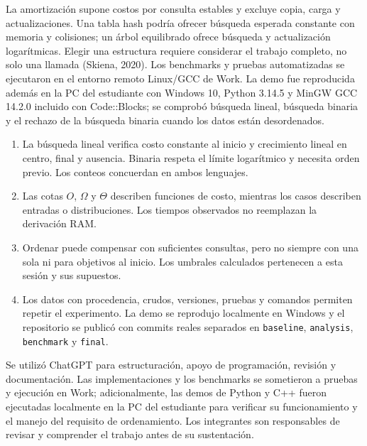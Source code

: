\documentclass[10pt,a4paper]{article}
\newcommand{\titulo}[1]{\vspace{3pt}{\large\bfseries\color{azul}#1}\par}
\begin{document}
La amortización supone costos por consulta estables y excluye copia, carga y actualizaciones. Una tabla hash podría ofrecer búsqueda esperada constante con memoria y colisiones; un árbol equilibrado ofrece búsqueda y actualización logarítmicas. Elegir una estructura requiere considerar el trabajo completo, no solo una llamada (Skiena, 2020). Los benchmarks y pruebas automatizadas se ejecutaron en el entorno remoto Linux/GCC de Work. La demo fue reproducida además en la PC del estudiante con Windows 10, Python 3.14.5 y MinGW GCC 14.2.0 incluido con Code::Blocks; se comprobó búsqueda lineal, búsqueda binaria y el rechazo de la búsqueda binaria cuando los datos están desordenados.

\titulo{8. Conclusiones}
\begin{enumerate}
\item La búsqueda lineal verifica costo constante al inicio y crecimiento lineal en centro, final y ausencia. Binaria respeta el límite logarítmico y necesita orden previo. Los conteos concuerdan en ambos lenguajes.
\item Las cotas $O$, $\Omega$ y $\Theta$ describen funciones de costo, mientras los casos describen entradas o distribuciones. Los tiempos observados no reemplazan la derivación RAM.
\item Ordenar puede compensar con suficientes consultas, pero no siempre con una sola ni para objetivos al inicio. Los umbrales calculados pertenecen a esta sesión y sus supuestos.
\item Los datos con procedencia, crudos, versiones, pruebas y comandos permiten repetir el experimento. La demo se reprodujo localmente en Windows y el repositorio se publicó con commits reales separados en \texttt{baseline}, \texttt{analysis}, \texttt{benchmark} y \texttt{final}.
\end{enumerate}

\titulo{9. Declaración de uso de IA}
Se utilizó ChatGPT para estructuración, apoyo de programación, revisión y documentación. Las implementaciones y los benchmarks se sometieron a pruebas y ejecución en Work; adicionalmente, las demos de Python y C++ fueron ejecutadas localmente en la PC del estudiante para verificar su funcionamiento y el manejo del requisito de ordenamiento. Los integrantes son responsables de revisar y comprender el trabajo antes de su sustentación.
\end{document}
